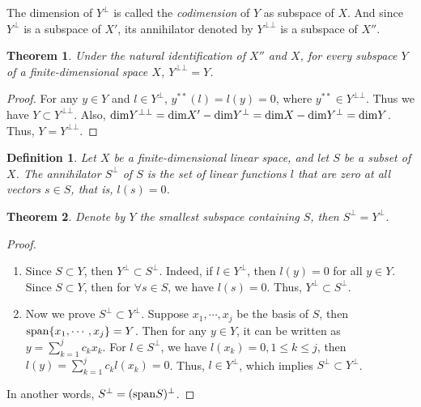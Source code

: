 \documentclass[11pt]{book}
\newtheorem{definition}{Definition}[section]
\newtheorem{theorem}{Theorem}[section]
\theoremstyle{definition}
\numberwithin{equation}{chapter}
\begin{document}
\medskip

The dimension of $Y^\bot$ is called the \emph{codimension} of $Y$ as subspace of $X$. And since $Y^\bot$ is a subspace of $X'$, its annihilator denoted by $Y^{\bot \bot}$ is a subspace of $X''$.

\medskip

\begin{theorem}
Under the natural identification of $X''$ and $X$, for every subspace $Y$ of a finite-dimensional space $X$, $Y^{\bot\bot} = Y$.
\end{theorem}
\begin{proof}
For any $y\in Y$ and $l\in Y^\bot$, $y^{**}(l) = l(y) = 0$, where $y^{**} \in Y^{\bot\bot}$. Thus we have $Y\subset Y^{\bot\bot}$. Also, ${\rm dim}Y^{\bot\bot} = {\rm dim}X' - {\rm dim}Y^\bot = {\rm dim}X - {\rm dim}Y^\bot = {\rm dim}Y$. Thus, $Y = Y^{\bot\bot}$.
\end{proof}

\medskip

\begin{definition}
Let $X$ be a finite-dimensional linear space, and let $S$ be a subset of $X$. The annihilator $S^\bot$ of $S$ is the set of linear functions $l$ that are zero at all vectors $s\in S$, that is, $l(s) = 0$. 
\end{definition}

\medskip

\begin{theorem}
Denote by $Y$ the smallest subspace containing $S$, then $S^\bot = Y^\bot$.
\end{theorem}
\begin{proof}
~\begin{enumerate}[label=(\alph*)]
    \item Since $S\subset Y$, then $Y^\bot\subset S^\bot$. Indeed, if $l\in Y^\bot$, then $l(y) = 0$ for all $y\in Y$. Since $S\subset Y$, then for $\forall s\in S$, we have $l(s) = 0$. Thus, $Y^\bot\subset S^\bot$. 
    \item Now we prove $S^\bot\subset Y^\bot$. Suppose $x_1,\cdots,x_j$ be the basis of $S$, then ${\rm span}\{x_1,\cdots,x_j\} = Y$. Then for any $y\in Y$, it can be written as $y = \sum^j_{k=1}c_k x_k$. For $l\in S^\bot$, we have $l(x_k) = 0, 1\leq k \leq j$, then $l(y) = \sum^j_{k=1}c_k l(x_k) = 0$. Thus, $l\in Y^\bot$, which implies $S^\bot\subset Y^\bot$. 
\end{enumerate}
In another words, $S^\bot = ({\rm span} S)^\bot$.
\end{proof}
\end{document}
